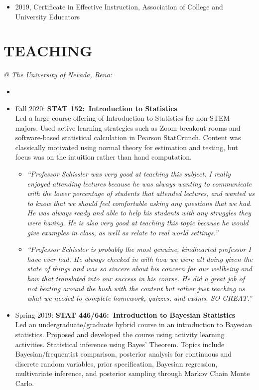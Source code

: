 \documentclass[paper=a4,fontsize=11pt]{scrartcl} %
\newcommand{\NewPart}[2]{\section*{\uppercase{#1} #2 }}
\newcommand{\CourseEntry}[3]{
		\noindent \item{#1: \textbf{#2} \\ #3}}
\begin{document}
\begin{itemize}[noitemsep]
    \item 2019, Certificate in Effective Instruction, Association of College and University Educators
\end{itemize}


\NewPart{Teaching}{}
\vspace{-7pt}
\textit{@ The University of Nevada, Reno:}
\begin{itemize}[noitemsep]
\item[]
\vspace{-15pt}

\CourseEntry{Fall 2020}{STAT 152:~Introduction to Statistics}{Led a large course offering of Introduction to Statistics for non-STEM majors. Used active learning strategies such as Zoom breakout rooms and software-based statistical calculation in Pearson StatCrunch. Content was classically motivated using normal theory for estimation and testing, but focus was on the intuition rather than hand computation.

\begin{itemize}
\item \emph{\small{``Professor Schissler was very good at teaching this subject. I really enjoyed attending lectures because he was always wanting to communicate with the lower percentage of students that attended lectures, and wanted us to know that we should feel comfortable asking any questions that we had. He was always ready and able to help his students with any struggles they were having. He is also very good at teaching this topic because he would give examples in class, as well as relate to real world settings.''}}
\item \emph{\small{``Professor Schissler is probably the most genuine, kindhearted professor I have ever had. He always checked in with how we were all doing given the state of things and was so sincere about his concern for our wellbeing and how that translated into our success in his course. He did a great job of not beating around the bush with the content but rather just teaching us what we needed to complete homework, quizzes, and exams. SO GREAT.''}}
\end{itemize}
}{} 

\CourseEntry{Spring 2019}{STAT 446/646:~Introduction to Bayesian Statistics}{Led an undergraduate/graduate hybrid course in an introduction to Bayesian statistics. Proposed and developed the course using activity learning activities. Statistical inference using Bayes’ Theorem. Topics include Bayesian/frequentist comparison, posterior analysis for continuous and discrete random variables, prior specification, Bayesian regression, multivariate inference, and posterior sampling through Markov Chain Monte Carlo.

}
\end{itemize}
\end{document}
